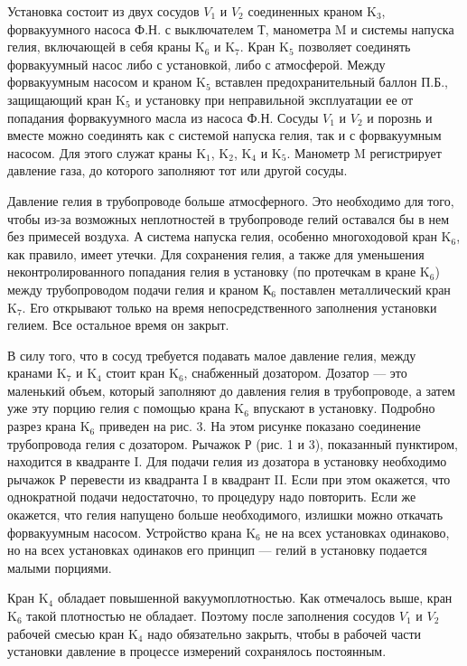 \documentclass[a4paper,12pt]{article} %
\begin{document}
Установка состоит из двух сосудов $V_{1}$ и $V_{2}$ соединенных краном K$_{3}$, форвакуумного насоса Ф.Н. с выключателем Т, манометра M и системы напуска гелия, включающей в себя краны K$_{6}$ и K$_{7}$. Кран K$_{5}$ позволяет соединять форвакуумный насос либо с установкой, либо с атмосферой. Между форвакуумным насосом и краном K$_{5}$ вставлен предохранительный баллон П.Б., защищающий кран K$_{5}$ и установку при неправильной эксплуатации ее от попадания форвакуумного масла из насоса Ф.Н. Сосуды $V_{1}$ и $V_{2}$ и порознь и вместе можно соединять как с системой напуска гелия, так и с форвакуумным насосом. Для этого служат краны K$_{1}$, K$_{2}$, K$_{4}$ и K$_{5}$. Манометр M регистрирует давление газа, до которого заполняют тот или другой сосуды.


Давление гелия в трубопроводе больше атмосферного. Это необходимо для того, чтобы из-за возможных неплотностей в трубопроводе гелий оставался бы в нем без примесей воздуха. А система напуска гелия, особенно многоходовой кран K$_{6}$, как правило, имеет утечки. Для сохранения гелия, а также для уменьшения неконтролированного попадания гелия в установку (по протечкам в кране K$_{6}$) между трубопроводом подачи гелия и краном К$_{6}$ поставлен металлический кран K$_{7}$. Его открывают только на время непосредственного заполнения установки гелием. Все остальное время он закрыт.


В силу того, что в сосуд требуется подавать малое давление гелия, между кранами K$_{7}$ и K$_{4}$ стоит кран K$_{6}$, снабженный дозатором. Дозатор — это маленький объем, который заполняют до давления гелия в трубопроводе, а затем уже эту порцию гелия с помощью крана K$_{6}$ впускают в установку. Подробно разрез крана K$_{6}$ приведен на рис. 3. На этом рисунке показано соединение трубопровода гелия с дозатором. Рычажок Р (рис. 1 и 3), показанный пунктиром, находится в квадранте I. Для подачи гелия из дозатора в установку необходимо рычажок Р перевести из квадранта I в квадрант II. Если при этом окажется, что однократной подачи недостаточно, то процедуру надо повторить. Если же окажется, что гелия напущено больше необходимого, излишки можно откачать форвакуумным насосом. Устройство крана K$_{6}$ не на всех установках одинаково, но на всех установках одинаков его принцип — гелий в установку подается малыми порциями.


Кран K$_{4}$ обладает повышенной вакуумоплотностью. Как отмечалось выше, кран K$_{6}$ такой плотностью не обладает. Поэтому после заполнения сосудов $V_{1}$ и $V_{2}$ рабочей смесью кран K$_{4}$ надо обязательно закрыть, чтобы в рабочей части установки давление в процессе измерений сохранялось постоянным.
\end{document}

